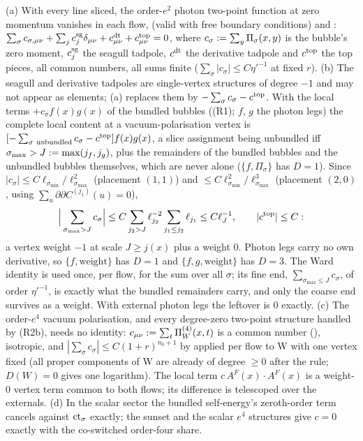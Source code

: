 \begin{lemma}\label{rot:h1s:VP}
\textup{(a)} With every line sliced, the order-$e^2$ photon two-point function at zero momentum vanishes in each flow, \cite[(2.23)--(2.28)]{Ba3} (valid with free boundary conditions) and \cite[\S3.5]{K1}: $\sum_{\sigma}c_{\sigma,\mu\nu}+\sum_jc^{\rm sg}_j\delta_{\mu\nu}+c^{\rm dt}_{\mu\nu}+c^{\rm top}_{\mu\nu}=0$, where $c_\sigma:=\sum_y\Pi_\sigma(x,y)$ is the bubble's zero moment, $c^{\rm sg}_j$ the seagull tadpole, $c^{\rm dt}$ the derivative tadpole and $c^{\rm top}$ the top pieces, all common numbers, all sums finite ($\sum_\sigma|c_\sigma|\le C\eta'^{-1}$ at fixed $r$). \textup{(b)} The seagull and derivative tadpoles are single-vertex structures of degree $-1$ and may not appear as elements; (a) replaces them by $-\sum_\sigma c_\sigma-c^{\rm top}$. With the local terms $+c_\sigma f(x)g(x)$ of the bundled bubbles ((R1); $f$, $g$ the photon legs) the complete local content at a vacuum-polarisation vertex is $[-\sum_{\sigma\ \rm unbundled}c_\sigma-c^{\rm top}]f(x)g(x)$, a slice assignment being unbundled iff $\sigma_{\max}>J:=\max(j_f,j_g)$, plus the remainders of the bundled bubbles and the unbundled bubbles themselves, which are never alone ($\{f,\Pi_\sigma\}$ has $D=1$). Since $|c_\sigma|\le C\ell_{\sigma_{\min}}/\ell_{\sigma_{\max}}^2$ (placement $(1,1)$) and $\le C\ell_{\sigma_{\min}}^2/\ell_{\sigma_{\max}}^3$ (placement $(2,0)$, using $\sum_u\partial\partial C^{(j_1)}(u)=0$),
\[
\Big|\sum_{\sigma_{\max}>J}c_\sigma\Big|\le C\sum_{j_2>J}\ell_{j_2}^{-2}\sum_{j_1\le j_2}\ell_{j_1}\le C\ell_J^{-1},\qquad|c^{\rm top}|\le C:
\]
a vertex weight $-1$ at scale $J\ge j(x)$ plus a weight $0$. Photon legs carry no own derivative, so $\{f,\text{weight}\}$ has $D=1$ and $\{f,g,\text{weight}\}$ has $D=3$. The Ward identity is used once, per flow, for the sum over all $\sigma$; its fine end, $\sum_{\sigma_{\max}\le J}c_\sigma$, of order $\eta'^{-1}$, is exactly what the bundled remainders carry, and only the coarse end survives as a weight. With external photon legs the leftover is $0$ exactly. \textup{(c)} The order-$e^4$ vacuum polarisation, and every degree-zero two-point structure handled by (R2b), needs no identity: $c_{\mu\nu}:=\sum_t\Pi^{(4)}_W(x,t)$ is a common number (), isotropic, and $|\sum_\sigma c_\sigma|\le C(1+r)^{n_0+1}$ by  applied per flow to W with one vertex fixed (all proper components of W are already of degree $\ge0$ after the rule; $D(W)=0$ gives one logarithm). The local term $c\,A^F(x)\cdot A^F(x)$ is a weight-$0$ vertex term common to both flows; its difference is telescoped over the externals. \textup{(d)} In the scalar sector the bundled self-energy's zeroth-order term cancels against ${\rm ct}_\sigma$ exactly; the sunset and the scalar $e^4$ structures give $c=0$ exactly with the co-switched order-four share.
\end{lemma}

